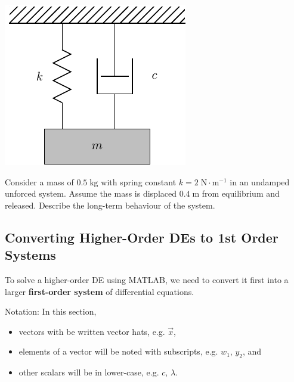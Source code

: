 \newpage

\includegraphics[width=0.4\linewidth]{graphics/notes_08_hanging_mass}




\newpage
\problem Consider a mass of $0.5 \; \text{kg}$ with spring constant
$k = 2 \; \text{N} \cdot \text{m}^{-1}$ in an undamped unforced
system.  Assume the mass is displaced $0.4 \; \text{m}$ from
equilibrium and released.  Describe the long-term behaviour of the
system.

\newpage


\subsection*{Converting Higher-Order DEs to 1st Order Systems}
To solve a higher-order DE using MATLAB, we need to convert it first
into a larger {\bf first-order system} of differential equations.


\vspace{0.3in}
Notation: In this section, 
\begin{itemize} 
\item vectors with be written vector hats, e.g. $\vec{x}$,
\item elements of a vector will be noted with subscripts, e.g. $w_1$,
  $y_2$, and
\item other scalars will be in lower-case, e.g. $c$, $\lambda$.
\end{itemize}

